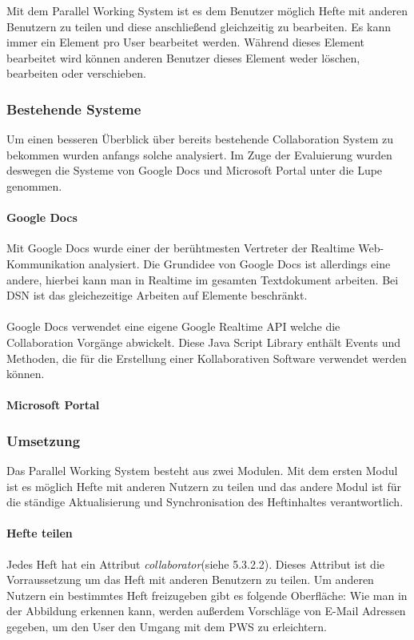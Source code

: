 Mit dem Parallel Working System ist es dem Benutzer möglich Hefte mit anderen Benutzern zu teilen und diese anschließend gleichzeitig zu bearbeiten. Es kann immer ein Element pro User bearbeitet werden. Während dieses Element bearbeitet wird können anderen Benutzer dieses Element weder löschen, bearbeiten oder verschieben. 
\subsubsection{Bestehende Systeme}
Um einen besseren Überblick über bereits bestehende Collaboration System zu bekommen wurden anfangs solche analysiert. Im Zuge der Evaluierung wurden deswegen die Systeme von Google Docs und Microsoft Portal unter die Lupe genommen.
\paragraph{Google Docs}
Mit Google Docs wurde einer der berühtmesten Vertreter der Realtime Web-Kommunikation analysiert. Die Grundidee von Google Docs ist allerdings eine andere, hierbei kann man in Realtime im gesamten Textdokument arbeiten. Bei DSN ist das gleichezeitige Arbeiten auf Elemente beschränkt.\\
\\
Google Docs verwendet eine eigene Google Realtime API welche die Collaboration Vorgänge abwickelt. Diese Java Script Library enthält Events und Methoden, die für die Erstellung einer Kollaborativen Software verwendet werden können. 
\paragraph{Microsoft Portal}
\subsubsection{Umsetzung}
Das Parallel Working System besteht aus zwei Modulen. Mit dem ersten Modul ist es möglich Hefte mit anderen Nutzern zu teilen und das andere Modul ist für die ständige Aktualisierung und Synchronisation des Heftinhaltes verantwortlich. 
\paragraph{Hefte teilen}
Jedes Heft hat ein Attribut \textit{collaborator}(siehe 5.3.2.2). Dieses Attribut ist die Vorraussetzung um das Heft mit anderen Benutzern zu teilen. 
Um anderen Nutzern ein bestimmtes Heft freizugeben gibt es folgende Oberfläche:
Wie man in der Abbildung erkennen kann, werden außerdem Vorschläge von E-Mail Adressen gegeben, um den User den Umgang mit dem PWS zu erleichtern.\\

